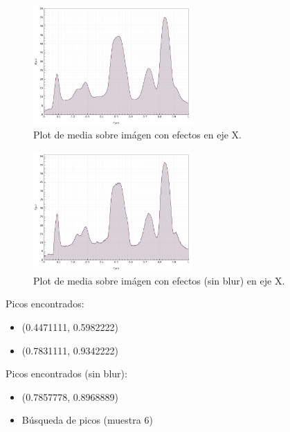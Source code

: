 \begin{figure}[H]
	\vspace{-0.2cm}
	\centering
	\includegraphics[width=230px]{imagenes-jtlc/experimento/search-peaks/5/plot-x}
	\centering
	\caption{Plot de media sobre im\'agen con efectos en eje X.}
	\label{fig:sp-5-plot-x-no-blur--repetido}
	\vspace{-0.15cm}
\end{figure}
\begin{figure}[H]
	\vspace{-0.2cm}
	\centering
	\includegraphics[width=230px]{imagenes-jtlc/experimento/search-peaks/5/plot-x-no-blur}
	\centering
	\caption{Plot de media sobre im\'agen con efectos (sin blur) en eje X.}
	\label{fig:sp-5-plot-x-no-blur}
	\vspace{-0.15cm}
\end{figure}

Picos encontrados:
\begin{itemize}
	\addtolength{\itemindent}{1cm}
	\item (0.4471111, 0.5982222)
	\item (0.7831111, 0.9342222)
\end{itemize}

Picos encontrados (sin blur):
\begin{itemize}
	\addtolength{\itemindent}{1cm}
	\item (0.7857778, 0.8968889)
\end{itemize}
	
\newpage
\begin{itemize}
	\item B\'usqueda de picos (muestra 6)
\end{itemize}
\vspace{-0.5cm}

